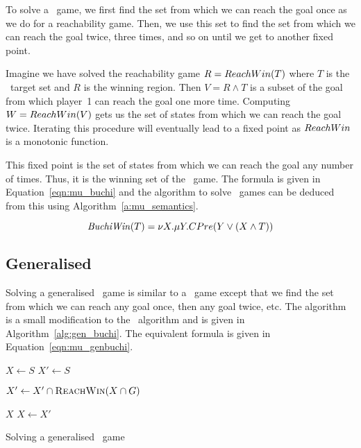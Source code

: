 To solve a \buchi\ game, we first find the set from which we can reach the goal once as we do for a reachability game. Then, we use this set to find the set from which we can reach the goal twice, three times, and so on until we get to another fixed point. 

Imagine we have solved the reachability game $R = ReachWin(T)$ where $T$ is the \buchi\ target set and $R$ is the winning region. Then $V = R \wedge T$ is a subset of the goal from which player~1 can reach the goal one more time. Computing $W = ReachWin(V)$ gets us the set of states from which we can reach the goal twice. Iterating this procedure will eventually lead to a fixed point as $ReachWin$ is a monotonic function.

This fixed point is the set of states from which we can reach the goal any number of times. Thus, it is the winning set of the \buchi\ game. The \mucalc formula is given in Equation~\ref{eqn:mu_buchi} and the algorithm to solve \buchi\ games can be deduced from this using Algorithm~\ref{a:mu_semantics}.

\begin{equation}
    \mathit{BuchiWin}(T) = \nu X. \mu Y. CPre(Y \vee (X \wedge T))
\label{eqn:mu_buchi}
\end{equation}

\subsection{Generalised \buchi}

Solving a generalised \buchi\ game is similar to a \buchi\ game except that we find the set from which we can reach any goal once, then any goal twice, etc. The algorithm is a small modification to the \buchi\ algorithm and is given in Algorithm~\ref{alg:gen_buchi}. The equivalent \mucalc formula is given in Equation~\ref{eqn:mu_genbuchi}.

\begin{algorithm}[t]
\begin{algorithmic}
\State $X \gets S$
\Loop
\State $X' \gets S$

\State $X' \gets X' \cap \Call{\reachFun}{X \cap G}$
\EndFor

\State\Return $X$\EndIf
\State $X \gets X'$

\EndLoop
\EndFunction
\end{algorithmic}
\caption{Solving a generalised \buchi\ game}
\label{alg:gen_buchi}
\end{algorithm}

